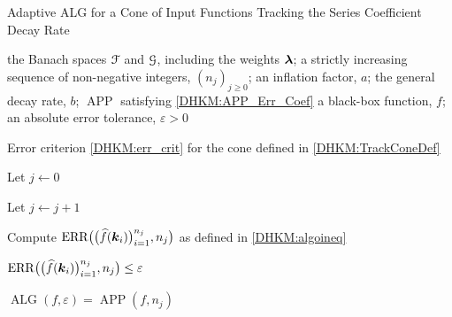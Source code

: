 \documentclass[USenglish]{article}
\theoremstyle{dgthm}
\theoremstyle{dgthm}
\theoremstyle{dgthm}
\theoremstyle{dgthm}
\theoremstyle{dgdef}
\theoremstyle{definition}
\DeclareMathOperator{\APP}{APP}
\DeclareMathOperator{\ALG}{ALG}
\DeclareMathOperator{\ERR}{ERR}
\newcommand{\dataNj}{\bigl(\hf(\bsk_i)\bigr)_{i=1}^{n_j}}
\newcommand{\ERRNj}{\ERR\bigl(\dataNj,n_j\bigr)}
\newcommand{\hf}{\widehat{f}}
\begin{document}
\begin{algorithm}
	\caption{Adaptive ALG for a Cone of Input Functions Tracking the Series Coefficient Decay Rate \label{DHKM:TrackConeAlg}}
	\begin{algorithmic}
	\PARAM the Banach spaces ${\mathcal{F}}$ and ${\mathcal{G}}$, including the weights ${\boldsymbol{\lambda}}$; a strictly increasing sequence of non-negative integers, $(n_j)_{j\ge 0}$; an inflation factor, $a$; the general decay rate, $b$; $\APP$ satisfying \eqref{DHKM:APP_Err_Coef}
		\INPUT a black-box function, $f$; an absolute error tolerance,
		$\varepsilon>0$

\Ensure Error criterion \eqref{DHKM:err_crit} for  the cone defined in \eqref{DHKM:TrackConeDef}

\State Let $j \leftarrow 0$
\Repeat

\State Let $j \leftarrow j + 1$

\State Compute $\ERRNj$ as defined in \eqref{DHKM:algoineq}

\Until $\ERRNj \le \varepsilon$

\RETURN $\ALG(f,\varepsilon) = \APP(f,n_{j})$
\end{algorithmic}
\end{algorithm}
\end{document}
